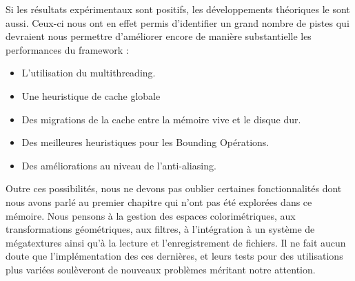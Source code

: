 	Si les résultats expérimentaux sont positifs, les développements théoriques le sont aussi. Ceux-ci nous ont en effet 
	permis d'identifier un grand nombre de pistes qui devraient nous permettre d'améliorer encore de manière substantielle 
	les performances du framework :
	\begin{itemize}
		\item L'utilisation du multithreading.
		\item Une heuristique de cache globale
		\item Des migrations de la cache entre la mémoire vive et le disque dur.
		\item Des meilleures heuristiques pour les Bounding Opérations.
		\item Des améliorations au niveau de l'anti-aliasing.
	\end{itemize} 

	Outre ces possibilités, nous ne devons pas oublier certaines fonctionnalités dont nous avons parlé au premier chapitre qui
	n'ont pas été explorées dans ce mémoire. Nous pensons à la gestion des espaces colorimétriques, 
	aux transformations géométriques, aux filtres, à  l'intégration à un système de mégatextures ainsi qu'à la lecture et 
	l'enregistrement de fichiers. Il ne fait aucun doute que l'implémentation des ces dernières, et leurs
	tests pour des utilisations plus variées soulèveront de nouveaux problèmes méritant notre attention.





